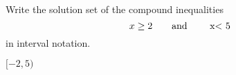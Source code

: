 

Write the solution set of the compound inequalities
\[x\geq 2\text{\quad\quad and \quad\quad x< 5} \]
in interval notation.

\begin{solution}
$[-2, 5)$
\end{solution}
